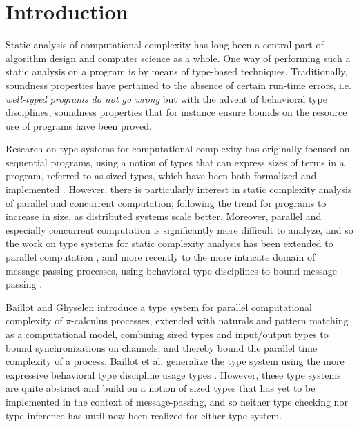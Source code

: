 \section{Introduction}\label{ch:introduction}

Static analysis of computational complexity has long been a central part of algorithm design and computer science as a whole. One way of performing such a static analysis on a program is by means of type-based techniques. Traditionally, soundness properties have pertained to the absence of certain run-time errors, i.e. \textit{well-typed programs do not go wrong} \cite{Milner1978} but  with the advent of behavioral type disciplines, soundness properties that for instance ensure bounds on the resource use of programs have been proved. %

Research on type systems for computational complexity has originally focused on sequential programs, using a notion of types that can express sizes of terms in a program, referred to as sized types, which have been both formalized and implemented \cite{HofmannAndJost2003,HofmannAndHoffmann2010,HoffmannEtAl2012,LagoGaboardi2012,AvanziniLago2017}. However, there is particularly interest in static complexity analysis of parallel and concurrent computation, following the trend for programs to increase in size, as distributed systems scale better. Moreover, parallel and especially concurrent computation is significantly more difficult to analyze, and so the work on type systems for static complexity analysis has been extended to parallel computation \cite{HoffmannShao2015}, and more recently to the more intricate domain of message-passing processes, using behavioral type disciplines to bound message-passing \cite{BaillotGhyselen2021,BaillotEtAl2021}.

Baillot and Ghyselen \cite{BaillotGhyselen2021} introduce a type system for parallel computational complexity of $\pi$-calculus processes, extended with naturals and pattern matching as a computational model, combining sized types and input/output types to bound synchronizations on channels, and thereby bound the parallel time complexity of a process. Baillot et al. \cite{BaillotEtAl2021} generalize the type system using the more expressive behavioral type discipline usage types \cite{Kobayashi1998,KobayashiEtAl2000}. However, these type systems are quite abstract and build on a notion of sized types that has yet to be implemented in the context of message-passing, and so neither type checking nor type inference has until now been realized for either type system.


